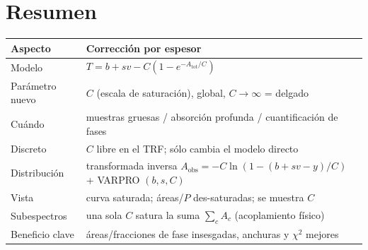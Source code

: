 \documentclass[11pt,a4paper]{article}
\begin{document}
\section{Resumen}

\begin{center}
\begin{tabular}{@{}ll@{}}
\toprule
\textbf{Aspecto} & \textbf{Corrección por espesor}\\
\midrule
Modelo & $T=b+s v - C(1-e^{-A_{\text{tot}}/C})$ \\
Parámetro nuevo & $C$ (escala de saturación), global, $C\to\infty$ = delgado\\
Cuándo & muestras gruesas / absorción profunda / cuantificación de fases\\
Discreto & $C$ libre en el TRF; sólo cambia el modelo directo\\
Distribución & transformada inversa $A_{\text{obs}}=-C\ln(1-(b+sv-y)/C)$ + VARPRO $(b,s,C)$\\
Vista & curva saturada; áreas/$P$ des-saturadas; se muestra $C$\\
Subespectros & una sola $C$ satura la suma $\sum_c A_c$ (acoplamiento físico)\\
Beneficio clave & áreas/fracciones de fase insesgadas, anchuras y $\chi^2$ mejores\\
\bottomrule
\end{tabular}
\end{center}
\end{document}
